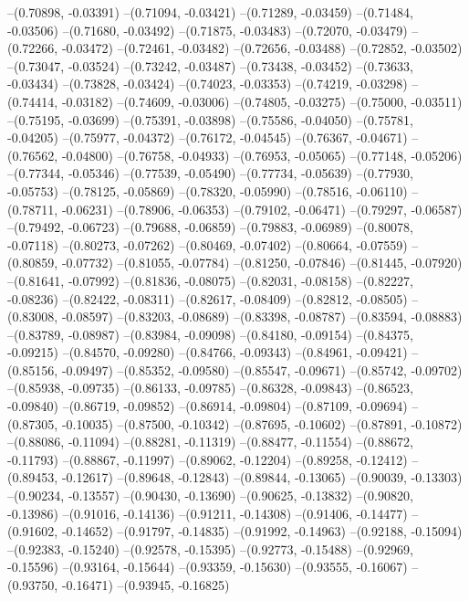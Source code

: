 --(0.70898, -0.03391)
--(0.71094, -0.03421)
--(0.71289, -0.03459)
--(0.71484, -0.03506)
--(0.71680, -0.03492)
--(0.71875, -0.03483)
--(0.72070, -0.03479)
--(0.72266, -0.03472)
--(0.72461, -0.03482)
--(0.72656, -0.03488)
--(0.72852, -0.03502)
--(0.73047, -0.03524)
--(0.73242, -0.03487)
--(0.73438, -0.03452)
--(0.73633, -0.03434)
--(0.73828, -0.03424)
--(0.74023, -0.03353)
--(0.74219, -0.03298)
--(0.74414, -0.03182)
--(0.74609, -0.03006)
--(0.74805, -0.03275)
--(0.75000, -0.03511)
--(0.75195, -0.03699)
--(0.75391, -0.03898)
--(0.75586, -0.04050)
--(0.75781, -0.04205)
--(0.75977, -0.04372)
--(0.76172, -0.04545)
--(0.76367, -0.04671)
--(0.76562, -0.04800)
--(0.76758, -0.04933)
--(0.76953, -0.05065)
--(0.77148, -0.05206)
--(0.77344, -0.05346)
--(0.77539, -0.05490)
--(0.77734, -0.05639)
--(0.77930, -0.05753)
--(0.78125, -0.05869)
--(0.78320, -0.05990)
--(0.78516, -0.06110)
--(0.78711, -0.06231)
--(0.78906, -0.06353)
--(0.79102, -0.06471)
--(0.79297, -0.06587)
--(0.79492, -0.06723)
--(0.79688, -0.06859)
--(0.79883, -0.06989)
--(0.80078, -0.07118)
--(0.80273, -0.07262)
--(0.80469, -0.07402)
--(0.80664, -0.07559)
--(0.80859, -0.07732)
--(0.81055, -0.07784)
--(0.81250, -0.07846)
--(0.81445, -0.07920)
--(0.81641, -0.07992)
--(0.81836, -0.08075)
--(0.82031, -0.08158)
--(0.82227, -0.08236)
--(0.82422, -0.08311)
--(0.82617, -0.08409)
--(0.82812, -0.08505)
--(0.83008, -0.08597)
--(0.83203, -0.08689)
--(0.83398, -0.08787)
--(0.83594, -0.08883)
--(0.83789, -0.08987)
--(0.83984, -0.09098)
--(0.84180, -0.09154)
--(0.84375, -0.09215)
--(0.84570, -0.09280)
--(0.84766, -0.09343)
--(0.84961, -0.09421)
--(0.85156, -0.09497)
--(0.85352, -0.09580)
--(0.85547, -0.09671)
--(0.85742, -0.09702)
--(0.85938, -0.09735)
--(0.86133, -0.09785)
--(0.86328, -0.09843)
--(0.86523, -0.09840)
--(0.86719, -0.09852)
--(0.86914, -0.09804)
--(0.87109, -0.09694)
--(0.87305, -0.10035)
--(0.87500, -0.10342)
--(0.87695, -0.10602)
--(0.87891, -0.10872)
--(0.88086, -0.11094)
--(0.88281, -0.11319)
--(0.88477, -0.11554)
--(0.88672, -0.11793)
--(0.88867, -0.11997)
--(0.89062, -0.12204)
--(0.89258, -0.12412)
--(0.89453, -0.12617)
--(0.89648, -0.12843)
--(0.89844, -0.13065)
--(0.90039, -0.13303)
--(0.90234, -0.13557)
--(0.90430, -0.13690)
--(0.90625, -0.13832)
--(0.90820, -0.13986)
--(0.91016, -0.14136)
--(0.91211, -0.14308)
--(0.91406, -0.14477)
--(0.91602, -0.14652)
--(0.91797, -0.14835)
--(0.91992, -0.14963)
--(0.92188, -0.15094)
--(0.92383, -0.15240)
--(0.92578, -0.15395)
--(0.92773, -0.15488)
--(0.92969, -0.15596)
--(0.93164, -0.15644)
--(0.93359, -0.15630)
--(0.93555, -0.16067)
--(0.93750, -0.16471)
--(0.93945, -0.16825)
